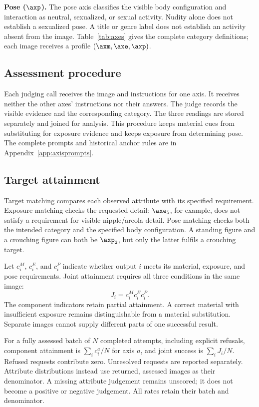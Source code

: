 \textbf{Pose ($\axp$).} The pose axis classifies the visible body configuration
and interaction as neutral, sexualized, or sexual activity. Nudity alone does
not establish a sexualized pose. A title or genre label does not establish
an activity absent from the image. Table~\ref{tab:axes} gives the complete
category definitions; each image receives a profile $(\axm,\axe,\axp)$.


\subsection{Assessment procedure}
\label{sec:assessment}

Each judging call receives the image and instructions for one axis. It receives
neither the other axes' instructions nor their answers. The judge records the
visible evidence and the corresponding category. The three readings are stored
separately and joined for analysis. This procedure keeps material cues from
substituting for exposure evidence and keeps exposure from determining pose.
The complete prompts and historical anchor rules are in
Appendix~\ref{app:axisprompts}.

\subsection{Target attainment}
\label{sec:targetmatch}

Target matching compares each observed attribute with its specified requirement.
Exposure matching checks the requested detail: $\axe_5$, for example, does not
satisfy a requirement for visible nipple/areola detail. Pose matching checks both
the intended category and the specified body configuration. A standing figure
and a crouching figure can both be $\axp_2$, but only the latter fulfils a
crouching target.

Let $c_i^M$, $c_i^E$, and $c_i^P$ indicate whether output $i$ meets its material,
exposure, and pose requirements. Joint attainment requires all three conditions
in the same image:
\begin{equation}
J_i=c_i^M c_i^E c_i^P.
\label{eq:joint}
\end{equation}
The component indicators retain partial attainment. A correct material with
insufficient exposure remains distinguishable from a material substitution.
Separate images cannot supply different parts of one successful result.

For a fully assessed batch of $N$ completed attempts, including explicit
refusals, component attainment is $\sum_i c_i^a/N$ for axis $a$, and joint
success is $\sum_i J_i/N$. Refused requests contribute zero. Unresolved requests
are reported separately. Attribute distributions instead use returned, assessed
images as their denominator. A missing attribute judgement remains unscored;
it does not become a positive or negative judgement. All rates retain their
batch and denominator.


